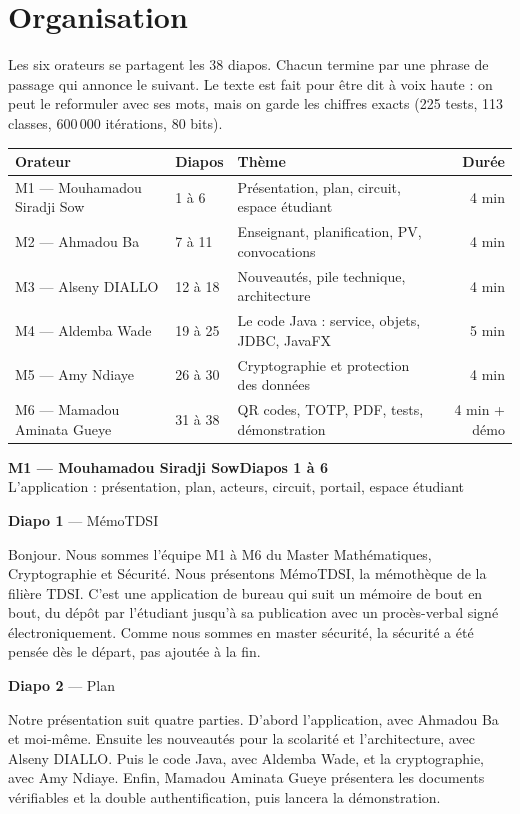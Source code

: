 \documentclass[11pt,a4paper]{article}
\newcommand{\orateur}[3]{%
  \clearpage
  \begin{tcolorbox}[colback=ucadnuit,colframe=ucadnuit,coltext=white,arc=2pt,
      left=10pt,right=10pt,top=8pt,bottom=8pt]
    {\large\textbf{#1}}\hfill{\color{ucador}\textbf{Diapos #2}}\\[2pt]
    {\small #3}
  \end{tcolorbox}\vspace{4pt}}
\newcommand{\diapo}[3]{%
  \begin{tcolorbox}[enhanced,breakable,colback=white,colframe=ucadbleu!45,
      borderline west={3pt}{0pt}{ucadbleu},arc=2pt,
      left=8pt,right=8pt,top=5pt,bottom=6pt]
    {\color{ucadnuit}\textbf{Diapo #1} — #2}\par\vspace{3pt}
    \og #3\fg{}
  \end{tcolorbox}\vspace{2pt}}
\begin{document}
\section*{\color{ucadnuit}Organisation}

Les six orateurs se partagent les 38 diapos. Chacun termine par une phrase de passage qui annonce le suivant.
Le texte est fait pour être dit à voix haute : on peut le reformuler avec ses mots, mais on garde les
chiffres exacts (225 tests, 113 classes, 600\,000 itérations, 80 bits).

\vspace{6pt}
\begin{tabularx}{\linewidth}{@{}l l Y r@{}}
  \toprule
  \textbf{Orateur} & \textbf{Diapos} & \textbf{Thème} & \textbf{Durée} \\
  \midrule
  M1 — Mouhamadou Siradji Sow & 1 à 6   & Présentation, plan, circuit, espace étudiant & 4 min \\
  M2 — Ahmadou Ba & 7 à 11  & Enseignant, planification, PV, convocations  & 4 min \\
  M3 — Alseny DIALLO & 12 à 18 & Nouveautés, pile technique, architecture     & 4 min \\
  M4 — Aldemba Wade & 19 à 25 & Le code Java : service, objets, JDBC, JavaFX & 5 min \\
  M5 — Amy Ndiaye & 26 à 30 & Cryptographie et protection des données      & 4 min \\
  M6 — Mamadou Aminata Gueye & 31 à 38 & QR codes, TOTP, PDF, tests, démonstration    & 4 min + démo \\
  \bottomrule
\end{tabularx}

\orateur{M1 — Mouhamadou Siradji Sow}{1 à 6}{L'application : présentation, plan, acteurs, circuit, portail, espace étudiant}

\diapo{1}{MémoTDSI}{Bonjour. Nous sommes l'équipe M1 à M6 du Master Mathématiques, Cryptographie et
Sécurité. Nous présentons MémoTDSI, la mémothèque de la filière TDSI. C'est une application de bureau qui
suit un mémoire de bout en bout, du dépôt par l'étudiant jusqu'à sa publication avec un procès-verbal signé
électroniquement. Comme nous sommes en master sécurité, la sécurité a été pensée dès le départ, pas ajoutée
à la fin.}

\diapo{2}{Plan}{Notre présentation suit quatre parties. D'abord l'application, avec Ahmadou Ba et moi-même.
Ensuite les nouveautés pour la scolarité et l'architecture, avec Alseny DIALLO. Puis le code Java, avec
Aldemba Wade, et la cryptographie, avec Amy Ndiaye. Enfin, Mamadou Aminata Gueye présentera les documents
vérifiables et la double authentification, puis lancera la démonstration.}
\end{document}
